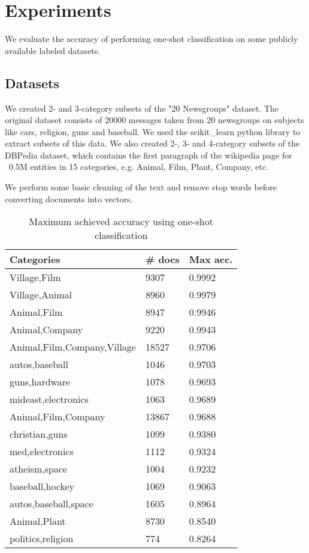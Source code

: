 \section{Experiments}
We evaluate the accuracy of performing one-shot classification on some publicly available labeled datasets.

\subsection{Datasets}
We created 2- and 3-category subsets of the "20 Newsgroups" dataset. The original dataset consists of 20000 messages taken from 20 newsgroups on subjects like cars, religion, guns and baseball. We used the scikit\_learn python library to extract subsets of this data. We also created 2-, 3- and 4-category subsets of the DBPedia dataset, which contains the first paragraph of the wikipedia page for ~0.5M entities in 15 categories, e.g. Animal, Film, Plant, Company, etc.

We perform some basic cleaning of the text and remove stop words before converting documents into vectors.

\begin{table}[]
\centering
\captionsetup{skip=0.5\baselineskip,size=footnotesize,position=bottom}
\footnotesize
\label{bruteforce}
\begin{tabular}{lll}
\toprule
Categories                  & \# docs & Max acc. \\
\midrule
Village,Film                & 9307         & 0.9992       \\
Village,Animal              & 8960         & 0.9979       \\
Animal,Film                 & 8947         & 0.9946       \\
Animal,Company              & 9220         & 0.9943       \\
Animal,Film,Company,Village & 18527        & 0.9706       \\
autos,baseball              & 1046         & 0.9703       \\
guns,hardware               & 1078         & 0.9693       \\
mideast,electronics         & 1063         & 0.9689       \\
Animal,Film,Company         & 13867        & 0.9688       \\
christian,guns              & 1099         & 0.9380       \\
med,electronics             & 1112         & 0.9324       \\
atheism,space               & 1004         & 0.9232       \\
baseball,hockey             & 1069         & 0.9063       \\
autos,baseball,space        & 1605         & 0.8964       \\
Animal,Plant                & 8730         & 0.8540       \\
politics,religion           & 774          & 0.8264      \\
\bottomrule
\end{tabular}
\caption{Maximum achieved accuracy using one-shot classification}
\end{table}

